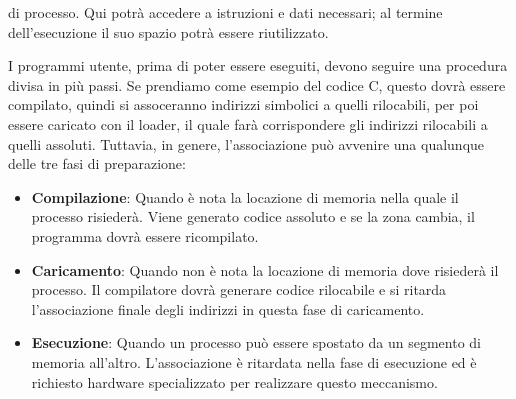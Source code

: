 di processo. Qui potrà accedere a istruzioni e dati necessari; al termine dell'esecuzione il suo spazio potrà essere riutilizzato.\par
I programmi utente, prima di poter essere eseguiti, devono seguire una procedura divisa in più passi. Se prendiamo come esempio del codice C, questo
dovrà essere compilato, quindi si assoceranno indirizzi simbolici a quelli rilocabili, per poi essere caricato con il loader, il quale farà
corrispondere gli indirizzi rilocabili a quelli assoluti. Tuttavia, in genere, l'associazione può avvenire una qualunque delle tre fasi di preparazione:
\begin{itemize}
    \item \textbf{Compilazione}: Quando è nota la locazione di memoria nella quale il processo risiederà. Viene generato codice assoluto e se la zona
    cambia, il programma dovrà essere ricompilato.
    \item \textbf{Caricamento}: Quando non è nota la locazione di memoria dove risiederà il processo. Il compilatore dovrà generare codice rilocabile e
    si ritarda l'associazione finale degli indirizzi in questa fase di caricamento.
    \item \textbf{Esecuzione}: Quando un processo può essere spostato da un segmento di memoria all'altro. L'associazione è ritardata nella fase di
    esecuzione ed è richiesto hardware specializzato per realizzare questo meccanismo.
\end{itemize}

